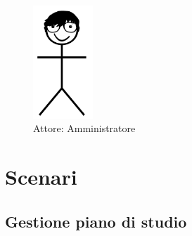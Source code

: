 \begin{figure}[h]
	\centering
	\includegraphics[width=0.2\textwidth]{imgs/attori/admin.png}
	\caption{Attore: Amministratore}
	\label{fig:Attore: Amministratore} 
\end{figure}



\newpage

\section{Scenari}

\subsection{Gestione piano di studio}
